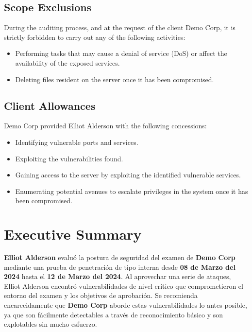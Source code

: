 \documentclass[a4paper]{article} %
\newcommand{\clientName}{Demo Corp}
\newcommand{\theAuthor}{Elliot Alderson}
\newcommand{\startDatePentest}{08 de Marzo del 2024}
\newcommand{\finalDatePentest}{12 de Marzo del 2024}
\begin{document}
    \subsection{Scope Exclusions}

    During the auditing process, and at the request of the client {\clientName}, it is strictly forbidden to carry out any of the following activities:
    
    \begin{itemize}
        \item Performing tasks that may cause a denial of service (DoS) or affect the availability of the exposed services.
        \item Deleting files resident on the server once it has been compromised.
    \end{itemize}
    
    \subsection{Client Allowances}
    {\clientName} provided {\theAuthor} with the following concessions:

    \begin{itemize}
        \item Identifying vulnerable ports and services.
        \item Exploiting the vulnerabilities found.
        \item Gaining access to the server by exploiting the identified vulnerable services.
        \item Enumerating potential avenues to escalate privileges in the system once it has been compromised.
    \end{itemize}

    \clearpage

    \section{Executive Summary}
    \textbf{\theAuthor} evaluó la postura de seguridad del examen de \textbf{\clientName} mediante una prueba de penetración de tipo interna desde \textbf{{\startDatePentest}} hasta el \textbf{{\finalDatePentest}}. Al aprovechar una serie de ataques, {\theAuthor} encontró vulnerabilidades de nivel crítico que comprometieron el entorno del examen y los objetivos de aprobación. Se recomienda encarecidamente que \textbf{\clientName} aborde estas vulnerabilidades lo antes posible, ya que son fácilmente detectables a través de reconocimiento básico y son explotables sin mucho esfuerzo.
\end{document}
